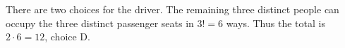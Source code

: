 There are two choices for the driver. The remaining three distinct people can occupy the three distinct passenger seats in $3!=6$ ways. Thus the total is $2\cdot 6=\boxed{12}$, choice D.
